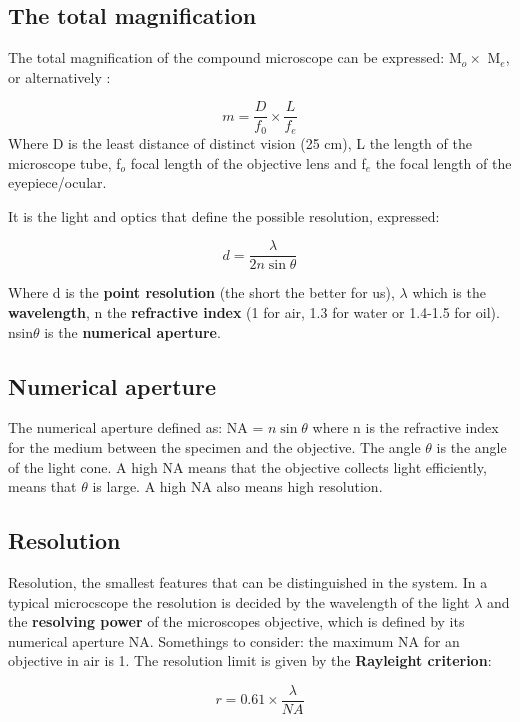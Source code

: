 	\subsection{The total magnification}
	The total magnification of the compound microscope can be expressed: M$_o \times$ M$_e$, or alternatively :

		\begin{equation}
		 	m = \frac{D} {f_0} \times \frac{L} {f_e} 
		 \end{equation}
	Where D is the least distance of distinct vision (25 cm), L the  length of the microscope tube, f$_o$ focal length of the objective lens and f$_e$ the focal length of the eyepiece/ocular. 

	It is the light and optics that define the possible resolution, expressed:

		\begin{equation}
			d = \frac{\lambda} {2n\sin\theta} 
		\end{equation}

	Where d is the \textbf{point resolution} (the short the better for us), $\lambda$ which is the \textbf{wavelength}, n the \textbf{refractive index} (1 for air, 1.3 for water or 1.4-1.5 for oil). nsin$\theta$ is the \textbf{numerical aperture}. 

	\subsection{Numerical aperture}
	The numerical aperture defined as: NA = $n\sin\theta$ where n is the refractive index for the medium between the specimen and the objective. The angle $\theta$ is the angle of the light cone. A high NA means that the objective collects light efficiently, means that $\theta$ is large. A high NA also means high resolution. 

	\subsection{Resolution}
	Resolution, the smallest features that can  be distinguished in the system. In a typical microcscope the resolution is decided by the wavelength of the light $\lambda$ and the \textbf{resolving power} of the microscopes objective, which is defined by its numerical aperture NA. 
	Somethings to consider: the maximum NA for an objective in air is 1. The resolution limit is given by the \textbf{Rayleight criterion}:

		\begin{equation}
		r = 0.61 \times \frac{\lambda} {NA} 
		\end{equation}

